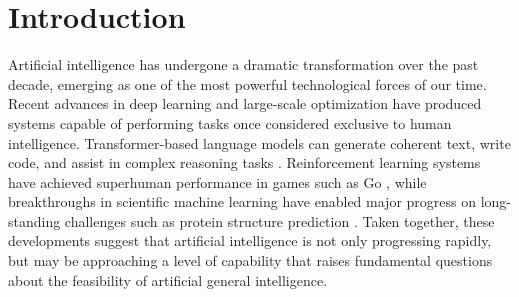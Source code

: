 \section{Introduction}
\label{ch:introduction}

Artificial intelligence has undergone a dramatic transformation over the past decade, emerging as one of the most powerful technological forces of our time. Recent advances in deep learning and large-scale optimization have produced systems capable of performing tasks once considered exclusive to human intelligence. Transformer-based language models can generate coherent text, write code, and assist in complex reasoning tasks \parencite{vaswani_attention_2017,brown_language_2020}. Reinforcement learning systems have achieved superhuman performance in games such as Go \parencite{silver_mastering_2016}, while breakthroughs in scientific machine learning have enabled major progress on long-standing challenges such as protein structure prediction \parencite{jumper_highly_2021}. Taken together, these developments suggest that artificial intelligence is not only progressing rapidly, but may be approaching a level of capability that raises fundamental questions about the feasibility of artificial general intelligence.

